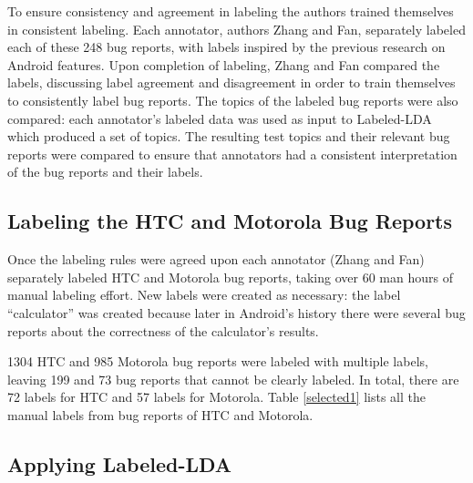\documentclass[10pt, conference, compsocconf]{IEEEtran}
\begin{document}
To ensure consistency and agreement in labeling the authors trained
themselves in consistent labeling.
Each annotator, authors Zhang and Fan, separately labeled each of
these 248 bug reports, with labels inspired by the previous research
on Android features.
Upon completion of labeling, Zhang and Fan compared the labels,
discussing label agreement and disagreement in order to train
themselves to consistently label bug reports.
The topics of the labeled bug reports were also compared: each
annotator's labeled data was used as input to Labeled-LDA which
produced a set of topics.
The resulting test topics and their relevant bug reports were
compared to ensure that annotators had a consistent interpretation of
the bug reports and their labels.




\subsection{Labeling the HTC and Motorola Bug Reports}

Once the labeling rules were agreed upon each annotator (Zhang and Fan)
separately labeled HTC and Motorola bug reports, taking over 60 man
hours of manual labeling effort.
New labels were created as necessary: the label ``calculator'' was
created because later in Android's history there were several bug
reports about the correctness of the calculator's results.


1304 HTC and 985 Motorola bug reports were labeled with multiple
labels, leaving 199 and 73 bug reports that cannot be clearly labeled.
In total, there are 72 labels for HTC and 57 labels for Motorola.
Table \ref{selected1} lists all the manual labels from bug reports of HTC
and Motorola.

\subsection{Applying Labeled-LDA}



\end{document}
